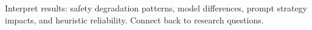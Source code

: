 Interpret results: safety degradation patterns, model differences, prompt strategy impacts, and heuristic reliability. Connect back to research questions.
